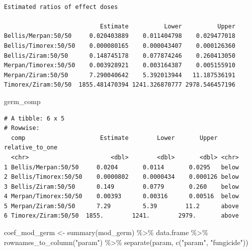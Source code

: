 \documentclass[
  letterpaper,
  DIV=11,
  numbers=noendperiod]{scrreport}
\newenvironment{Shaded}{\begin{snugshade}}{\end{snugshade}}
\newcommand{\FunctionTok}[1]{\textcolor[rgb]{0.28,0.35,0.67}{#1}}
\newcommand{\NormalTok}[1]{\textcolor[rgb]{0.00,0.23,0.31}{#1}}
\newcommand{\OtherTok}[1]{\textcolor[rgb]{0.00,0.23,0.31}{#1}}
\newcommand{\SpecialCharTok}[1]{\textcolor[rgb]{0.37,0.37,0.37}{#1}}
\newcommand{\StringTok}[1]{\textcolor[rgb]{0.13,0.47,0.30}{#1}}
\begin{document}
\begin{verbatim}

Estimated ratios of effect doses

                           Estimate          Lower          Upper
Bellis/Merpan:50/50     0.020403889    0.011404798    0.029477018
Bellis/Timorex:50/50    0.000080165    0.000043407    0.000126360
Bellis/Ziram:50/50      0.148745178    0.077874246    0.260413050
Merpan/Timorex:50/50    0.003928921    0.003164387    0.005155910
Merpan/Ziram:50/50      7.290040642    5.392013944   11.187536191
Timorex/Ziram:50/50  1855.481470394 1241.326870777 2978.546457196
\end{verbatim}

\begin{Shaded}
\begin{Highlighting}[]
\NormalTok{germ\_comp}
\end{Highlighting}
\end{Shaded}

\begin{verbatim}
# A tibble: 6 x 5
# Rowwise: 
  comp                     Estimate        Lower       Upper relative_to_one
  <chr>                       <dbl>        <dbl>       <dbl> <chr>          
1 Bellis/Merpan:50/50     0.0204       0.0114       0.0295   below          
2 Bellis/Timorex:50/50    0.0000802    0.0000434    0.000126 below          
3 Bellis/Ziram:50/50      0.149        0.0779       0.260    below          
4 Merpan/Timorex:50/50    0.00393      0.00316      0.00516  below          
5 Merpan/Ziram:50/50      7.29         5.39        11.2      above          
6 Timorex/Ziram:50/50  1855.        1241.        2979.       above          
\end{verbatim}

\begin{Shaded}
\begin{Highlighting}[]
\NormalTok{coef\_mod\_germ }\OtherTok{\textless{}{-}} \FunctionTok{summary}\NormalTok{(mod\_germ) }\SpecialCharTok{\%\textgreater{}\%}\NormalTok{ data.frame }\SpecialCharTok{\%\textgreater{}\%} 
    \FunctionTok{rownames\_to\_column}\NormalTok{(}\StringTok{"param"}\NormalTok{)  }\SpecialCharTok{\%\textgreater{}\%} 
  \FunctionTok{separate}\NormalTok{(param, }\FunctionTok{c}\NormalTok{(}\StringTok{"param"}\NormalTok{, }\StringTok{"fungicide"}\NormalTok{))}
\end{Highlighting}
\end{Shaded}
\end{document}
